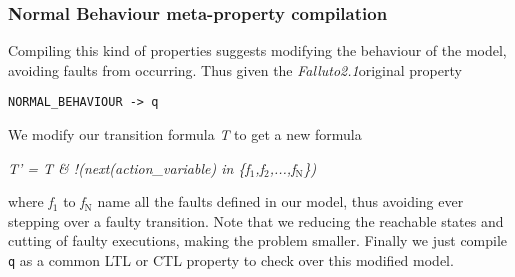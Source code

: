 \documentclass[12pt]{article}
\newcommand{\falluto}{\mbox{\textit{Falluto2.1}}}
\newcommand{\textusc}[1]{$_{\text{#1}}$} %
\begin{document}
\subsubsection*{Normal Behaviour meta-property compilation}
Compiling this kind of properties suggests modifying the behaviour of the model, avoiding faults from occurring. Thus given the \falluto original property
\begin{center}
\texttt{NORMAL\_BEHAVIOUR -> q}
\end{center}
We modify our transition formula \textit{T} to get a new formula 
\begin{center}
\textit{T' = T \& !(next(action\_variable) in \{f\textusc{1},f\textusc{2},...,f\textusc{N}\})}
\end{center}
where \textit{f\textusc{1}} to \textit{f\textusc{N}} name all the faults defined in our model, thus avoiding ever stepping over a faulty transition. Note that we reducing the reachable states and cutting of faulty executions, making the problem smaller.
Finally we just compile \texttt{q} as a common LTL or CTL property to check over this modified model.
\end{document}
